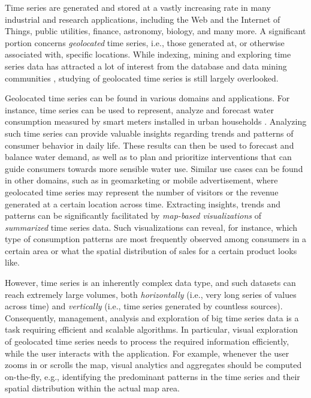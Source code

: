 Time series are generated and stored at a vastly increasing rate in many industrial and research applications, including the Web and the Internet of Things, public utilities, finance, astronomy, biology, and many more. A significant portion concerns \emph{geolocated} time series, i.e., those generated at, or otherwise associated with, specific locations. While indexing, mining and exploring time series data has attracted a lot of interest from the database and data mining communities \cite{camerra2014kais,ding2008pvldb,shieh2008kdd}, studying of geolocated time series is still largely overlooked.

Geolocated time series can be found in various domains and applications. For instance, time series can be used to represent, analyze and forecast water consumption measured by smart meters installed in urban households \cite{DBLP:conf/edbt/ChronisGA16}. Analyzing such time series can provide valuable insights regarding trends and patterns of consumer behavior in daily life. These results can then be used to forecast and balance water demand, as well as to plan and prioritize interventions that can guide consumers towards more sensible water use. Similar use cases can be found in other domains, such as in geomarketing or mobile advertisement, where geolocated time series may represent the number of visitors or the revenue generated at a certain location across time. Extracting insights, trends and patterns can be significantly facilitated by {\em map-based visualizations} of {\em summarized} time series data. Such visualizations can reveal, for instance, which type of consumption patterns are most frequently observed among consumers in a certain area or what the spatial distribution of sales for a certain product looks like. 

However, time series is an inherently complex data type, and such datasets can reach extremely large volumes, both {\em horizontally} (i.e., very long series of values across time) and {\em vertically} (i.e., time series generated by countless sources). Consequently, management, analysis and exploration of big time series data is a task requiring efficient and scalable algorithms. In particular, visual exploration of geolocated time series needs to process the required information efficiently, while the user interacts with the application. For example, whenever the user zooms in or scrolls the map, visual analytics and aggregates should be computed on-the-fly, e.g., identifying the predominant patterns in the time series and their spatial distribution within the actual map area.


